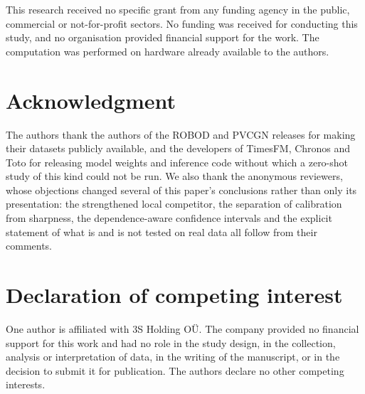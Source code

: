 \documentclass[11pt]{article}
\theoremstyle{plain}
\theoremstyle{definition}
\theoremstyle{remark}
\newif\ifrevisionmarkup
\newcommand{\new}[1]{\ifrevisionmarkup\textcolor{revision}{#1}\else#1\fi}
\begin{document}
\new{This research received no specific grant from any funding agency in the public, commercial or not-for-profit sectors. No funding was received for conducting this study, and no organisation provided financial support for the work. The computation was performed on hardware already available to the authors.}

\section*{\new{Acknowledgment}}

\new{The authors thank the authors of the ROBOD and PVCGN releases for making their datasets publicly available, and the developers of TimesFM, Chronos and Toto for releasing model weights and inference code without which a zero-shot study of this kind could not be run. We also thank the anonymous reviewers, whose objections changed several of this paper's conclusions rather than only its presentation: the strengthened local competitor, the separation of calibration from sharpness, the dependence-aware confidence intervals and the explicit statement of what is and is not tested on real data all follow from their comments.}

\section*{\new{Declaration of competing interest}}

\new{One author is affiliated with 3S Holding O\"U. The company provided no financial support for this work and had no role in the study design, in the collection, analysis or interpretation of data, in the writing of the manuscript, or in the decision to submit it for publication. The authors declare no other competing interests.}



\end{document}
